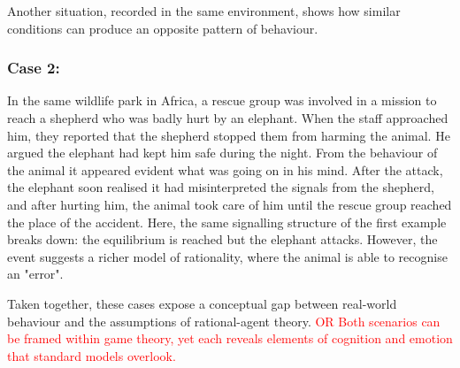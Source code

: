 \vspace{1em}
Another situation, recorded in the same environment, shows how similar conditions can produce an opposite pattern of behaviour.

\subsubsection*{Case 2:}
In the same wildlife park in Africa, a rescue group was involved in a mission to reach a shepherd who was badly hurt by an elephant. When the staff approached him, they reported that the shepherd stopped them from harming the animal. He argued the elephant had kept him safe during the night. From the behaviour of the animal it appeared evident what was going on in his mind. After the attack, the elephant soon realised it had misinterpreted the signals from the shepherd, and after hurting him, the animal took care of him until the rescue group reached the place of the accident.
Here, the same signalling structure of the first example breaks down: the equilibrium is reached but the elephant attacks. However,
the event suggests a richer model of rationality, where the animal is able to recognise an "error".
\vspace{1em}

Taken together, these cases expose a conceptual gap between real-world behaviour and the assumptions of rational-agent theory. \textcolor{red}{OR Both scenarios can be framed within game theory, yet each reveals elements of cognition and emotion that standard models overlook.}

